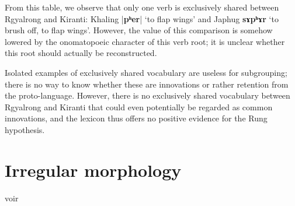 \documentclass[oldfontcommands,oneside,a4paper,11pt]{article}
\newcommand{\ipa}[1]{{\phon\textbf{#1}}}
\newcommand{\forme}[2]{\ipa{#1} `#2'}
\newcommand{\dhatu}[2]{|\ipa{#1}| `#2'}
\begin{document}
From this table, we observe that only one verb is exclusively shared between Rgyalrong and Kiranti: Khaling \dhatu{pʰer}{to flap wings} and Japhug \forme{sɤpʰɤr}{to brush off, to flap wings}. However, the value of this comparison is somehow lowered by the onomatopoeic character of this verb root; it is unclear whether this root should actually be reconstructed.  
 

Isolated examples of exclusively shared vocabulary are useless for subgrouping; there is no way to know whether these are innovations or rather retention from the proto-language. However, there is no exclusively shared vocabulary between Rgyalrong and Kiranti that could even potentially be regarded as common innovations, and the lexicon thus offers no positive evidence for the Rung hypothesis.

\section{Irregular morphology}



 voir \citet{meillet75}  \citet{schindler72apophonie} 







\end{document}
